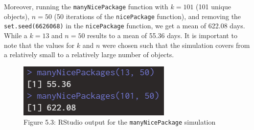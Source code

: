 \documentclass[12pt,letterpaper]{article}
\newcommand{\code}[1]{\colorbox{light-gray}{\texttt{#1}}}
\begin{document}
\begin{enumerate}[label=\Alph*]
        Moreover, running the \code{manyNicePackage} function with $k=101$ (101 unique objects), $n=50$ (50 iterations of the \code{nicePackage} function), and removing the \code{set.seed(6626068)} in the \code{nicePackage} function, we get a mean of 622.08 days. While a $k=13$ and $n=50$ results to a mean of 55.36 days. It is important to note that the values for $k$ and $n$ were chosen such that the simulation covers from a relatively small to a relatively large number of objects.
        \vspace*{0.8cm}
        \begin{figure}[h]
          \centering
          \includegraphics[scale=0.7]{manyNicePackage.png}
          \caption*{\footnotesize Figure 5.3: RStudio output for the \code{manyNicePackage} simulation}
        \end{figure}

    \end{enumerate}
    
    
\end{document}

